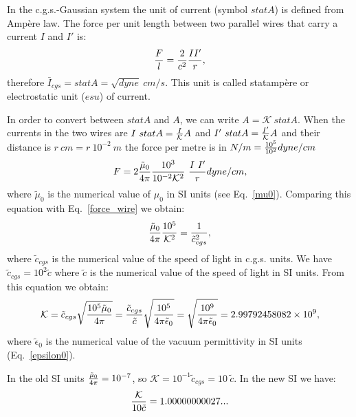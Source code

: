 \documentclass[12pt,a4paper]{article}
\def\kappa{2.99792458082\times 10^{9}}
\def\kappadiecic{1.00000000027}
\begin{document}
{\color{orange} In the c.g.s.-Gaussian system the unit of current 
(symbol $statA$) is defined from Amp\`ere law. The force per unit length 
between two parallel wires that carry a current $I$ and $I'$ is:
\begin{equation}
{F\over l} = {2\over c^2} {I I'\over r},
\label{force_wire}
\end{equation}
therefore $\bar I_{cgs}=statA=\sqrt{dyne}\ cm/s$. This unit is called 
statamp\`ere or 
electrostatic unit ($esu$) of current.

In order to convert between $statA$ and $A$, we can write 
$A= \mathcal{K}\ statA$. 
When the currents in the two wires are $I\ statA={I\over \mathcal{K}} A$ and 
$I'\ statA={I'\over \mathcal{K}} A$ and their distance
is $r\ cm=r\ 10^{-2}\ m$ the force per metre is in $N/m=
{10^5\over 10^2} dyne/cm$
\begin{equation}
F=2{\tilde \mu_0\over 4\pi} {10^3\over 10^{-2} \mathcal{K}^2}\ {I\ I' \over r} dyne/cm,
\end{equation}
where $\tilde \mu_0$ is the numerical value of $\mu_0$ in SI units
(see Eq.~\ref{mu0}). Comparing this equation with Eq.~\ref{force_wire} we
obtain:
\begin{equation}
{\tilde \mu_0 \over 4 \pi} {10^5\over \mathcal{K}^2} = 
{1\over \tilde c_{cgs}^2}, 
\end{equation}
where $\tilde c_{cgs}$ is the numerical value of the speed of light in
c.g.s. units. We have $\tilde c_{cgs}=10^2 \tilde c$ where $\tilde c$ is
the numerical value of the speed of light in SI units. From this
equation we obtain:
\begin{equation}
\mathcal{K} = \tilde c_{cgs} \sqrt {10^5 \tilde \mu_0 \over 4 \pi} =
{\tilde c_{cgs}\over \tilde c} 
\sqrt {10^5 \over 4 \pi \tilde \epsilon_0}=\sqrt {10^9 \over 4 \pi 
\tilde \epsilon_0}=\kappa,
\end{equation}
where $\tilde \epsilon_0$ is the numerical value of the vacuum permittivity
in SI units (Eq.~\ref{epsilon0}).

In the old SI units ${\tilde \mu_0 \over 4 \pi} = 10^{-7}$, so 
$\mathcal{K}=10^{-1} \tilde c_{cgs}= 10\ \tilde c$.
In the new SI we have:
\begin{equation}
{\mathcal{K}\over 10 \tilde c}= \kappadiecic...
\end{equation}
\\
}
\end{document}
